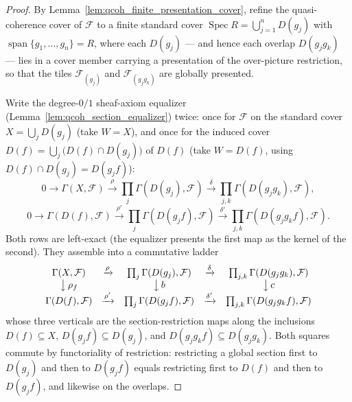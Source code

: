 \begin{proof}
    \leanok
  By Lemma~\ref{lem:qcoh_finite_presentation_cover}, refine the quasi-coherence cover of
  \(\mathcal{F}\) to a finite standard cover \(\operatorname{Spec} R = \bigcup_{j=1}^{n} D(g_j)\) with
  \(\operatorname{span}\{g_1, \ldots, g_n\} = R\), where each \(D(g_j)\) — and hence each overlap
  \(D(g_j g_k)\) — lies in a cover member carrying a presentation of the over-picture restriction, so
  that the tiles \(\mathcal{F}_{(g_j)}\) and \(\mathcal{F}_{(g_j g_k)}\) are globally presented.

  Write the degree-\(0/1\) sheaf-axiom equalizer (Lemma~\ref{lem:qcoh_section_equalizer}) twice: once for
  \(\mathcal{F}\) on the standard cover \(X = \bigcup_j D(g_j)\) (take \(W = X\)), and once for the induced
  cover \(D(f) = \bigcup_j \bigl(D(f) \cap D(g_j)\bigr)\) of \(D(f)\) (take \(W = D(f)\), using
  \(D(f) \cap D(g_j) = D(g_j f)\)):
  \[
    0 \to \Gamma(X, \mathcal{F}) \xrightarrow{\rho} \prod_j \Gamma(D(g_j), \mathcal{F})
      \xrightarrow{\delta} \prod_{j,k} \Gamma(D(g_j g_k), \mathcal{F}),
  \]
  \[
    0 \to \Gamma(D(f), \mathcal{F}) \xrightarrow{\rho'} \prod_j \Gamma(D(g_j f), \mathcal{F})
      \xrightarrow{\delta'} \prod_{j,k} \Gamma(D(g_j g_k f), \mathcal{F}).
  \]
  Both rows are left-exact (the equalizer presents the first map as the kernel of the second). They
  assemble into a commutative ladder
  \[
    \begin{array}{ccccc}
      \Gamma(X, \mathcal{F}) & \xrightarrow{\rho} & \prod_j \Gamma(D(g_j), \mathcal{F})
        & \xrightarrow{\delta} & \prod_{j,k} \Gamma(D(g_j g_k), \mathcal{F}) \\
      \big\downarrow{\,\rho_f} & & \big\downarrow{\,b} & & \big\downarrow{\,c} \\
      \Gamma(D(f), \mathcal{F}) & \xrightarrow{\rho'} & \prod_j \Gamma(D(g_j f), \mathcal{F})
        & \xrightarrow{\delta'} & \prod_{j,k} \Gamma(D(g_j g_k f), \mathcal{F})
    \end{array}
  \]
  whose three verticals are the section-restriction maps along the inclusions \(D(f) \subseteq X\),
  \(D(g_j f) \subseteq D(g_j)\), and \(D(g_j g_k f) \subseteq D(g_j g_k)\). Both squares commute by
  functoriality of restriction: restricting a global section first to \(D(g_j)\) and then to
  \(D(g_j f)\) equals restricting first to \(D(f)\) and then to \(D(g_j f)\), and likewise on the
  overlaps.


\end{proof}

